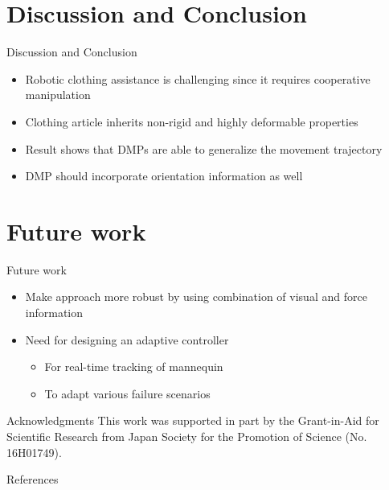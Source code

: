 \documentclass[aspectratio=43,11pt,xcolor={dvipsnames}]{beamer}
\begin{document}
\section{Discussion and Conclusion}
\begin{frame}{Discussion and Conclusion}
	\linespread{1.5}
				
	\begin{itemize}
		\item Robotic clothing assistance is challenging since it requires cooperative manipulation
		\item Clothing article inherits non-rigid and highly deformable properties
		\item Result shows that DMPs are able to generalize the movement trajectory
		\item DMP should incorporate orientation information as well
	\end{itemize}
\end{frame}

\section{Future work}
\begin{frame}{Future work}
	\linespread{1.5}
				
	\begin{itemize}
		\item Make approach more robust by using combination of visual and force information
		\item Need for designing an adaptive controller
		      \begin{itemize}
		      	\item For real-time tracking of mannequin
		      	\item To adapt various failure scenarios
		      \end{itemize}
	\end{itemize}
				
	\begin{exampleblock}{Acknowledgments}
		This work was supported in part by the Grant-in-Aid for Scientific Research from Japan Society for the Promotion of Science (No. 16H01749).
	\end{exampleblock}
\end{frame}

\begin{frame}[noframenumbering]{References}
	\nocite{*}
	\hspace*{0.5cm}
	\begin{minipage}{\dimexpr\textwidth-1cm\relax}
		\printbibliography
	\end{minipage}
\end{frame}
\end{document}
